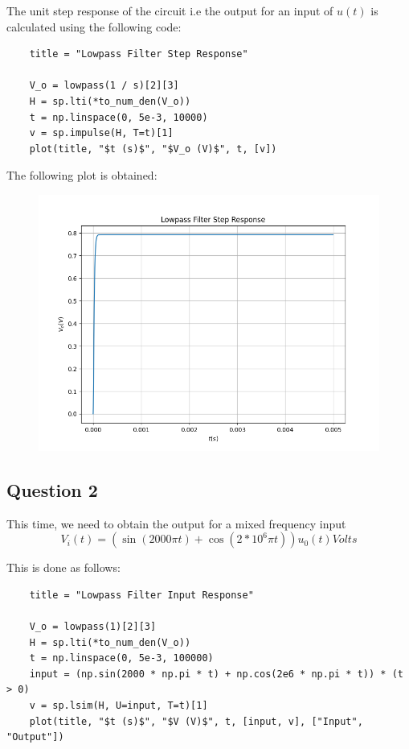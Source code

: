\documentclass[12pt, a4paper]{article}
\begin{document}
The unit step response of the circuit i.e the output for an input of $u(t)$ is calculated using the following code:

\begin{lstlisting}
    title = "Lowpass Filter Step Response"

    V_o = lowpass(1 / s)[2][3]
    H = sp.lti(*to_num_den(V_o))
    t = np.linspace(0, 5e-3, 10000)
    v = sp.impulse(H, T=t)[1]
    plot(title, "$t (s)$", "$V_o (V)$", t, [v])
\end{lstlisting}

The following plot is obtained:
\begin{figure}[H]
    \centering
    \includegraphics[scale=0.6]{1.png}
\end{figure}

\subsection{Question 2}
This time, we need to obtain the output for a mixed frequency input
\[V_i(t) = (\sin(2000\pi t)+\cos(2*10^6\pi t))u_0(t) Volts\]

This is done as follows:
\begin{lstlisting}
    title = "Lowpass Filter Input Response"

    V_o = lowpass(1)[2][3]
    H = sp.lti(*to_num_den(V_o))
    t = np.linspace(0, 5e-3, 100000)
    input = (np.sin(2000 * np.pi * t) + np.cos(2e6 * np.pi * t)) * (t > 0)
    v = sp.lsim(H, U=input, T=t)[1]
    plot(title, "$t (s)$", "$V (V)$", t, [input, v], ["Input", "Output"])
\end{lstlisting}
\end{document}
